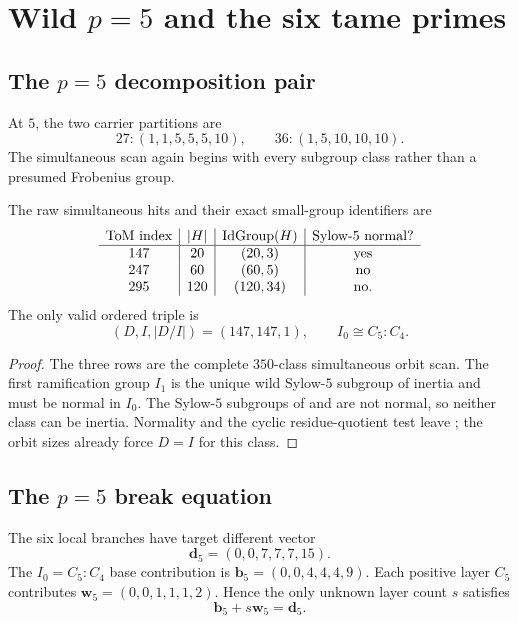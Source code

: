 \section{\texorpdfstring{Wild \(p=5\) and the six tame primes}{Wild p=5 and the six tame primes}}
\label{sec:five-and-tame}

\subsection{\texorpdfstring{The \(p=5\) decomposition pair}{The p=5 decomposition pair}}

At $5$, the two carrier partitions are
\[
27:(1,1,5,5,5,10),\qquad 36:(1,5,10,10,10).
\]
The simultaneous scan again begins with every subgroup class rather than a
presumed Frobenius group.

\begin{proposition}[Unique \(p=5\) pair]
\label{prop:p5-pair}
The raw simultaneous hits and their exact small-group identifiers are
\[
\begin{array}{c|c|c|c}
\text{ToM index}&|H|&\operatorname{IdGroup}(H)&\text{Sylow-}5\text{ normal?}\\ \hline
147&20&(20,3)&\text{yes}\\
247&60&(60,5)&\text{no}\\
295&120&(120,34)&\text{no}.
\end{array}
\]
The only valid ordered triple is
\[
 (D,I,|D/I|)=(147,147,1),\qquad I_0\cong C_5:C_4.
\]
\end{proposition}

\begin{proof}
The three rows are the complete $350$-class simultaneous orbit scan.  The
first ramification group $I_1$ is the unique wild Sylow-$5$ subgroup of
inertia and must be normal in $I_0$.  The Sylow-$5$ subgroups of 
and  are not normal, so neither class can be inertia.  Normality and
the cyclic residue-quotient test leave ; the orbit sizes already
force $D=I$ for this class.
\end{proof}

\subsection{\texorpdfstring{The \(p=5\) break equation}{The p=5 break equation}}

The six local branches have target different vector
\[
 \mathbf d_5=(0,0,7,7,7,15).
\]
The $I_0=C_5:C_4$ base contribution is
$\mathbf b_5=(0,0,4,4,4,9)$.  Each positive layer $C_5$ contributes
$\mathbf w_5=(0,0,1,1,1,2)$.  Hence the only unknown layer count $s$
satisfies
\begin{equation}
 \mathbf b_5+s\mathbf w_5=\mathbf d_5.
\label{eq:p5-layer-equation}
\end{equation}

